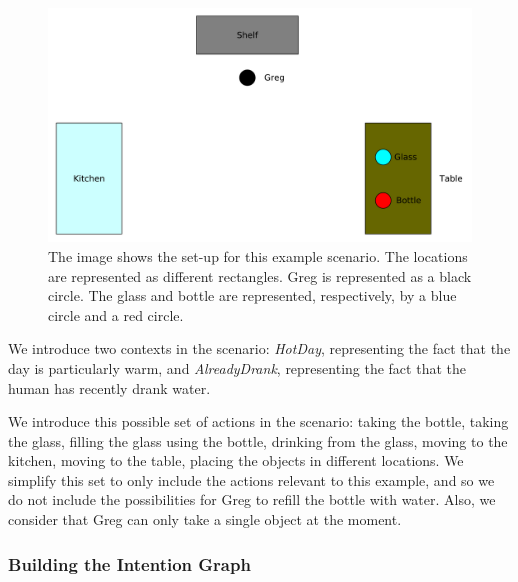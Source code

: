  \begin{figure}[ht!]
	\includegraphics[scale=0.5]{img/situation_assessment/ig_scenario.pdf}
	\caption[IG Example Scenario]{The image shows the set-up for this example scenario. The locations are represented as different rectangles. Greg is represented as a black circle. The glass and bottle are represented, respectively, by a blue circle and a red circle.}
	\label{fig:situation_assessment-ig_scenario}
\end{figure}

We introduce two contexts in the scenario: \textit{HotDay}, representing the fact that the day is particularly warm, and \textit{AlreadyDrank}, representing the fact that the human has recently drank water.

We introduce this possible set of actions in the scenario: taking the bottle, taking the glass, filling the glass using the bottle, drinking from the glass, moving to the kitchen, moving to the table, placing the objects in different locations. We simplify this set to only include the actions relevant to this example, and so we do not include the possibilities for Greg to refill the bottle with water. Also, we consider that Greg can only take a single object at the moment. 

\subsubsection{Building the Intention Graph}

